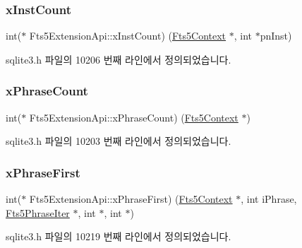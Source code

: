 \subsubsection{\texorpdfstring{x\+Inst\+Count}{xInstCount}}
{\footnotesize\ttfamily int($\ast$ Fts5\+Extension\+Api\+::x\+Inst\+Count) (\hyperlink{sqlite3_8h_a97821b95ebebd43db901977ffd5b26bc}{Fts5\+Context} $\ast$, int $\ast$pn\+Inst)}



sqlite3.\+h 파일의 10206 번째 라인에서 정의되었습니다.

\mbox{\label{struct_fts5_extension_api_a3ba0207080a9ca498625eefcc120bf1e}} 
\subsubsection{\texorpdfstring{x\+Phrase\+Count}{xPhraseCount}}
{\footnotesize\ttfamily int($\ast$ Fts5\+Extension\+Api\+::x\+Phrase\+Count) (\hyperlink{sqlite3_8h_a97821b95ebebd43db901977ffd5b26bc}{Fts5\+Context} $\ast$)}



sqlite3.\+h 파일의 10203 번째 라인에서 정의되었습니다.

\mbox{\label{struct_fts5_extension_api_ae2584a3afa2a70504847600e609d43ad}} 
\subsubsection{\texorpdfstring{x\+Phrase\+First}{xPhraseFirst}}
{\footnotesize\ttfamily int($\ast$ Fts5\+Extension\+Api\+::x\+Phrase\+First) (\hyperlink{sqlite3_8h_a97821b95ebebd43db901977ffd5b26bc}{Fts5\+Context} $\ast$, int i\+Phrase, \hyperlink{struct_fts5_phrase_iter}{Fts5\+Phrase\+Iter} $\ast$, int $\ast$, int $\ast$)}



sqlite3.\+h 파일의 10219 번째 라인에서 정의되었습니다.

\mbox{\label{struct_fts5_extension_api_ac57daf9650e3f0c25432bbe348bc124f}} 
